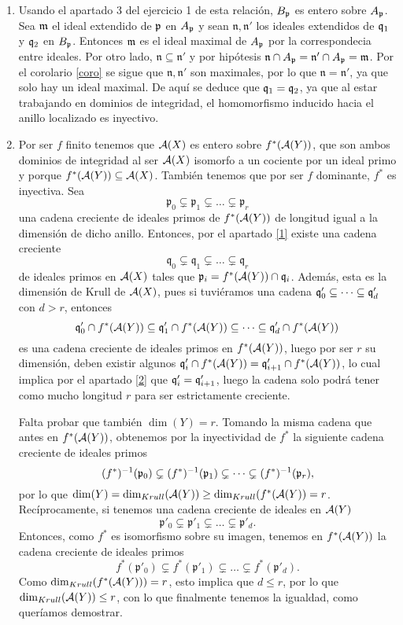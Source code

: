 \documentclass[twoside]{article}
\begin{document}
\begin{solucion}
\begin{enumerate}
\item  Usando el apartado 3 del ejercicio 1 de esta relación, $B_{\mathfrak{p}}$ es entero sobre $A_{\mathfrak{p}}$. Sea $\mathfrak{m}$ el ideal extendido de $\mathfrak{p}$ en $A_{\mathfrak{p}}$ y sean $\mathfrak{n},\mathfrak{n}'$ los ideales extendidos de $\mathfrak{q}_1$ y $\mathfrak{q}_2$ en $B_{\mathfrak{p}}$. Entonces $\mathfrak{m}$ es el ideal maximal de $A_{\mathfrak{p}}$ por la correspondecia entre ideales. Por otro lado, $\mathfrak{n}\subseteq\mathfrak{n}'$ y por hipótesis $\mathfrak{n}\cap A_{\mathfrak{p}}=\mathfrak{n}'\cap A_{\mathfrak{p}}=\mathfrak{m}$. Por el corolario \ref{coro} se sigue que $\mathfrak{n},\mathfrak{n}'$ son maximales, por lo que $\mathfrak{n}=\mathfrak{n}'$, ya que solo hay un ideal maximal. De aquí se deduce que $\mathfrak{q}_1=\mathfrak{q}_2$, ya que al estar trabajando en dominios de integridad, el homomorfismo inducido hacia el anillo localizado es inyectivo.


\item Por ser $f$ finito tenemos que $\mathcal{A}(X)$ es entero sobre $f^*(\mathcal{A}(Y))$, que son ambos dominios de integridad al ser $\mathcal{A}(X)$ isomorfo a un cociente por un ideal primo y porque $f^*(\mathcal{A}(Y))\subseteq\mathcal{A}(X)$. También tenemos que por ser $f$ dominante, $f^*$ es inyectiva. Sea 
$$\mathfrak{p}_0 \subsetneq \mathfrak{p}_1 \subsetneq \dots \subsetneq \mathfrak{p}_r$$ 
una cadena creciente de ideales primos de $f^*(\mathcal{A}(Y))$ de longitud igual a la dimensión de dicho anillo. Entonces, por el apartado \ref{1} existe una cadena creciente
$$\mathfrak{q}_0 \subsetneq \mathfrak{q}_1 \subsetneq \dots \subsetneq \mathfrak{q}_r$$ 
de ideales primos en $\mathcal{A}(X)$ tales que $\mathfrak{p}_i = f^*(\mathcal{A}(Y)) \cap \mathfrak{q}_i$. Además, esta es la dimensión de Krull de $\mathcal{A}(X)$, pues si tuviéramos una cadena $\mathfrak{q}'_0\subseteq\dots\subseteq \mathfrak{q}'_d$ con $d>r$, entonces 
$$\mathfrak{q}'_0\cap f^*(\mathcal{A}(Y))\subseteq \mathfrak{q}'_1\cap f^*(\mathcal{A}(Y))\subseteq\dots\subseteq \mathfrak{q}'_d\cap f^*(\mathcal{A}(Y))$$ 
es una cadena creciente de ideales primos en $f^*(\mathcal{A}(Y))$, luego por ser $r$ su dimensión, deben existir algunos $\mathfrak{q}'_i\cap f^*(\mathcal{A}(Y))=\mathfrak{q}'_{i+1}\cap f^*(\mathcal{A}(Y))$, lo cual implica por el apartado \ref{2} que $\mathfrak{q}'_i=\mathfrak{q}'_{i+1}$, luego la cadena solo podrá tener como mucho longitud $r$ para ser estrictamente creciente. 

Falta probar que también $\dim(Y)=r$. Tomando la misma cadena que antes en $f^*(\mathcal{A}(Y))$, obtenemos por la inyectividad de $f^*$ la siguiente cadena creciente de ideales primos
$$(f^*)^{-1}(\mathfrak{p}_0)\subsetneq (f^*)^{-1}(\mathfrak{p}_1)\subsetneq\dots\subsetneq (f^*)^{-1}(\mathfrak{p}_r),$$
por lo que $\dim(Y)=\dim_{Krull}(\mathcal{A}(Y))\geq\dim_{Krull}(f^*(\mathcal{A}(Y))=r$. Recíprocamente, si tenemos una cadena creciente de ideales en $\mathcal{A}(Y)$
$$\mathfrak{p}'_0 \subsetneq \mathfrak{p}'_1 \subsetneq \dots \subsetneq \mathfrak{p}'_d.$$
Entonces, como $f^*$ es isomorfismo sobre su imagen, tenemos en $f^*(\mathcal{A}(Y))$ la cadena creciente de ideales primos
$$f^*(\mathfrak{p}'_0) \subsetneq f^*(\mathfrak{p}'_1) \subsetneq \dots \subsetneq f^*(\mathfrak{p}'_d).$$
Como $\dim_{Krull}(f^*(\mathcal{A}(Y)))=r$, esto implica que $d\leq r$, por lo que $\dim_{Krull}(\mathcal{A}(Y))\leq r$, con lo que finalmente tenemos la igualdad, como queríamos demostrar.

\end{enumerate}
\end{solucion}
\end{document}
